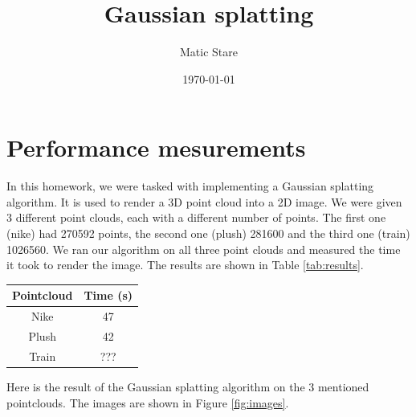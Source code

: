 \documentclass{article}
\title{Gaussian splatting}
\author{Matic Stare}
\date{\today}
\begin{document}
\maketitle

\tableofcontents
\newpage

\section{Performance mesurements}\label{sec:p1}
In this homework, we were tasked with implementing a Gaussian splatting algorithm. It is used to render a 3D point cloud into a 2D image. We were given 3 different point clouds, each with a different number of points. The first one (nike) had 270592 points, the second one (plush) 281600 and the third one (train) 1026560. We ran our algorithm on all three point clouds and measured the time it took to render the image. The results are shown in Table \ref{tab:results}.


\begin{center}
    \begin{tabular}{ |c|c| } 
     \hline
     Pointcloud & Time (s) \\
     \hline
     Nike & 47 \\ 
     Plush & 42 \\ 
     Train & ??? \\ 
     \hline
    \end{tabular}
\end{center}\label{tab:results}

Here is the result of the Gaussian splatting algorithm on the 3 mentioned pointclouds. The images are shown in Figure \ref{fig:images}.
\end{document}
